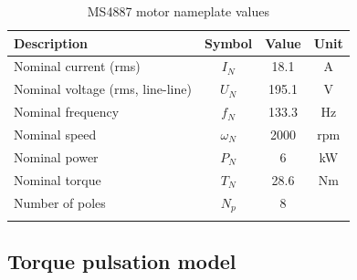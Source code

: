 


\begin{table}[ht]
\caption{MS4887 motor nameplate values}
\centering
\begin{tabular}[t]{lccc}
\hline
Description & Symbol & Value  & Unit\\
\hline
Nominal current (rms) & $I_N$ & 18.1  & A\\
Nominal voltage (rms, line-line)  & $U_N$  & 195.1 & V\\
Nominal frequency & $f_N$      & 133.3 & Hz\\
Nominal speed     & $\omega_N$ & 2000  & rpm\\
Nominal power     & $P_N$      & 6     & kW\\
Nominal torque    & $T_N$      & 28.6  & Nm\\
Number of poles   & $N_p$      & 8     & \\
\hline
\label{Tbl:MS4887}
\end{tabular}
\end{table}%

\subsection{Torque pulsation model}


